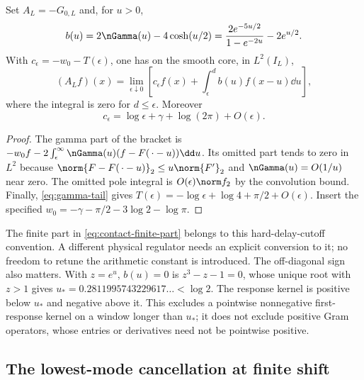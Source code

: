 \begin{proposition}
\label{prop:contact-response}
Set $A_L=-G_{0,L}$ and, for $u>0$,
\begin{equation}\label{eq:offdiag-response}
 b(u)=2\nGamma(u)-4\cosh(u/2)
     =\frac{2e^{-5u/2}}{1-e^{-2u}}-2e^{u/2}.
\end{equation}
With $c_\epsilon=-w_0-T(\epsilon)$, one has on the smooth core,
in $L^2(I_L)$,
\begin{equation}\label{eq:contact-response}
 (A_Lf)(x)=\lim_{\epsilon\downarrow0}
 \left[c_\epsilon f(x)+
       \int_\epsilon^d b(u)f(x-u)\dd u\right],
\end{equation}
where the integral is zero for $d\le\epsilon$. Moreover
\begin{equation}\label{eq:contact-finite-part}
 c_\epsilon=\log\epsilon+\gamma+\log(2\pi)+O(\epsilon).
\end{equation}
\end{proposition}
\begin{proof}
The gamma part of the bracket is
$-w_0f-2\int_\epsilon^\infty\nGamma(u)(f-F(\,\cdot-u))\dd u$.
Its omitted part tends to zero in $L^2$ because
$\norm{F-F(\,\cdot-u)}_2\le u\norm{F'}_2$ and
$\nGamma(u)=O(1/u)$ near zero. The omitted pole integral
is $O(\epsilon)\norm f_2$ by the convolution bound. Finally,
\eqref{eq:gamma-tail} gives
$T(\epsilon)=-\log\epsilon+\log4+\pi/2+O(\epsilon)$.
Insert the specified
$w_0=-\gamma-\pi/2-3\log2-\log\pi$.
\end{proof}

The finite part in \eqref{eq:contact-finite-part} belongs to
this hard-delay-cutoff convention. A different physical
regulator needs an explicit conversion to it; no freedom to
retune the arithmetic constant is introduced.
The off-diagonal sign also matters. With $z=e^u$,
$b(u)=0$ is $z^3-z-1=0$, whose unique root with $z>1$
gives $u_*=0.2811995743229617\ldots<\log2$.
The response kernel is positive below $u_*$ and negative
above it. This excludes a pointwise nonnegative first-response
kernel on a window longer than $u_*$; it does not exclude
positive Gram operators, whose entries or derivatives need
not be pointwise positive.

\subsection{The lowest-mode cancellation at finite shift}
\label{subsec:absorbed-pole}

